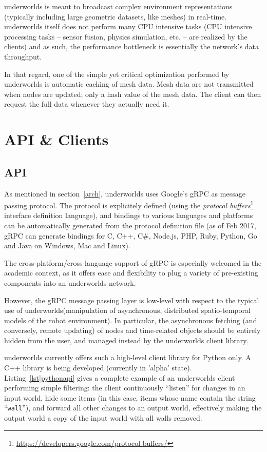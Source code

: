 \documentclass[letterpaper, 10 pt, conference]{ieeeconf}  %
\newcommand{\uwds}{{\sc underworlds}\xspace}
\begin{document}
\uwds is meant to broadcast complex environment representations (typically
including large geometric datasets, like meshes) in real-time. \uwds itself does
not perform many CPU intensive tasks (CPU intensive processing tasks -- sensor fusion, physics
simulation, etc. -- are realized by the clients) and as such, the performance
bottleneck is essentially the network's data throughput.

In that regard, one of the simple yet critical optimization performed by \uwds
is automatic caching of mesh data. Mesh data are not transmitted when nodes are
updated; only a hash value of the mesh data. The client can then request the
full data whenever they actually need it.



\section{API \& Clients}

\subsection{API}
\label{api}

As mentioned in section~\ref{arch}, \uwds uses Google's gRPC as message passing
protocol. The protocol is explicitely defined (using the \emph{protocol
buffers}\footnote{\url{https://developers.google.com/protocol-buffers/}}
interface definition language), and bindings to various languages
and platforms can be automatically generated from the protocol definition file
(as of Feb 2017, gRPC can generate bindings for C, C++, C\#, Node.js, PHP, Ruby,
Python, Go and Java on Windows, Mac and Linux).

The cross-platform/cross-language support of gRPC is especially welcomed in the
academic context, as it offers ease and flexibility to plug a variety of
pre-existing components into an \uwds network.


However, the gRPC message passing layer is low-level with respect to the typical
use of \uwds (manipulation of asynchronous, distributed spatio-temporal models
of the robot environment). In particular, the asynchronous fetching (and
conversely, remote updating) of nodes and time-related objects should be
entirely hidden from the user, and managed instead by the \uwds client library.

\uwds currently offers such a high-level client library for Python only. A C++
library is being developed (currently in 'alpha' state).
Listing~\ref{lst|pythonapi} gives a complete example of an \uwds client
performing simple filtering: the client continuously ``listen'' for changes in
an input world, hide some items (in this case, items whose name contain the
string ``{\tt wall}''), and forward all other changes to an output world,
effectively making the output world a copy of the input world with all walls
removed.
\end{document}
